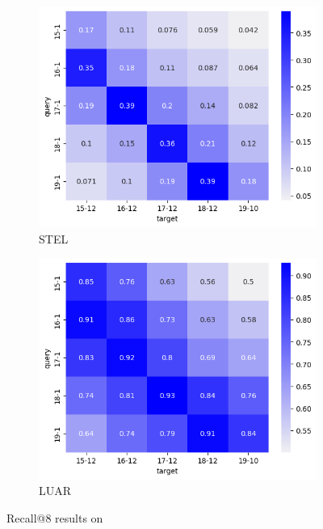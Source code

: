 \begin{figure}[h]
    
    \begin{subfigure}{0.48\linewidth}
    \includegraphics[width=\linewidth]{stylometryExtensions/figures/heat/stel.png}
    \caption{STEL}
    \label{fig:tempral_vary:stel}
    \end{subfigure}
    \begin{subfigure}{0.48\linewidth}
    \includegraphics[width=\linewidth]{stylometryExtensions/figures/heat/luar.png}
    \caption{LUAR}
    \label{fig:tempral_vary:LUAR}
    \end{subfigure}

    \caption{Recall@8 results on \DSvarydelta{}}
    \label{fig:temporal_vary}
\end{figure}

